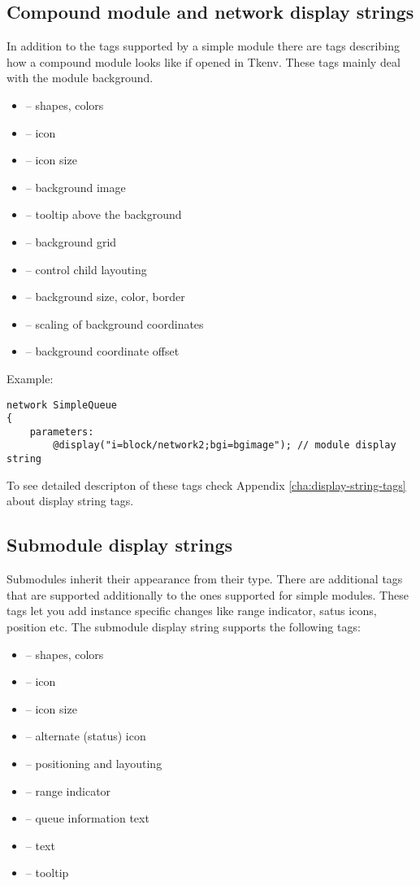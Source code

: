 \subsection{Compound module and network display strings}

In addition to the tags supported by a simple module there are tags
describing how a compound module looks like if opened in Tkenv. These
tags mainly deal with the module background.

\begin{itemize}
  \item{ -- shapes, colors}
  \item{ -- icon}
  \item{ -- icon size}
  \item{ -- background image}
  \item{ -- tooltip above the background}
  \item{ -- background grid}
  \item{ -- control child layouting}
  \item{ -- background size, color, border}
  \item{ -- scaling of background coordinates}
  \item{ -- background coordinate offset}
\end{itemize}

Example:
\begin{verbatim}
network SimpleQueue
{
    parameters:
        @display("i=block/network2;bgi=bgimage"); // module display string
\end{verbatim}

To see detailed descripton of these tags check 
Appendix \ref{cha:display-string-tags} about display string tags.

\subsection{Submodule display strings}

Submodules inherit their appearance from their type. There are
additional tags that are supported additionally to the ones supported
for simple modules. These tags let you add instance specific changes
like range indicator, satus icons, position etc.
The submodule display string supports the following tags:
\begin{itemize}
  \item{ -- shapes, colors}
  \item{ -- icon}
  \item{ -- icon size}
  \item{ -- alternate (status) icon}
  \item{ -- positioning and layouting}
  \item{ -- range indicator}
  \item{ -- queue information text}
  \item{ -- text}
  \item{ -- tooltip}
\end{itemize}

